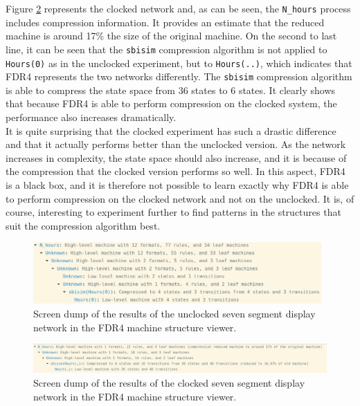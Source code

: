 Figure \ref{fig:clocked_compression} represents the clocked network and, as can be seen, the \texttt{N\_hours} process includes compression information. It provides an estimate that the reduced machine is around 17\% the size of the original machine. On the second to last line, it can be seen that the \texttt{sbisim} compression algorithm is not applied to \texttt{Hours(0)} as in the unclocked experiment, but to \texttt{Hours(..)}, which indicates that FDR4 represents the two networks differently. The \texttt{sbisim} compression algorithm is able to compress the state space from 36 states to 6 states. It clearly shows that because FDR4 is able to perform compression on the clocked system, the performance also increases dramatically.\\

It is quite surprising that the clocked experiment has such a drastic difference and that it actually performs better than the unclocked version. As the network increases in complexity, the state space should also increase, and it is because of the compression that the clocked version performs so well.
In this aspect, FDR4 is a black box, and it is therefore not possible to learn exactly why FDR4 is able to perform compression on the clocked network and not on the unclocked. It is, of course, interesting to experiment further to find patterns in the \cspm{} structures that suit the compression algorithm best.
\begin{figure}
    \includegraphics[width=0.98\textwidth]{./figures/unclocked_compression.jpg}
\caption{Screen dump of the results of the unclocked seven segment display network in the FDR4 machine structure viewer.}
\label{fig:unclocked_compression}
\end{figure}
\begin{figure}
    \includegraphics[width=1.02\textwidth]{./figures/clocked_compression.jpg}
\caption{Screen dump of the results of the clocked seven segment display network in the FDR4 machine structure viewer.}
\label{fig:clocked_compression}
\end{figure}

